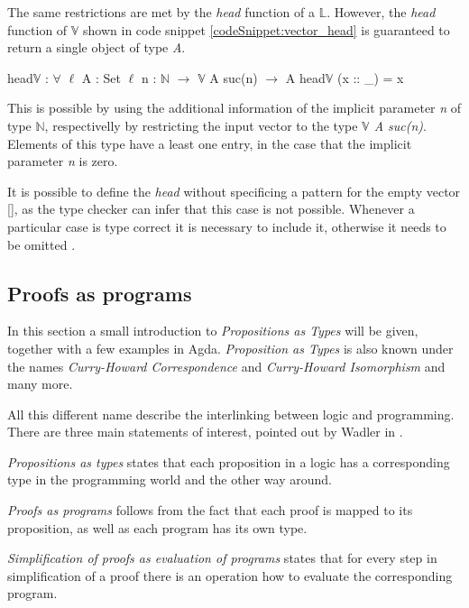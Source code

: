 The same restrictions are met by the \emph{head} function of a $\mathbb{L}$. 
However, the \emph{head} function of $\mathbb{V}$ shown in code snippet \ref{codeSnippet:vector_head} is guaranteed to return a single object of type \emph{A}.

\begin{codesnippet}[mathescape=true, caption={Definition of $head\mathbb{V}$ function in Agda}, label={codeSnippet:vector_head}]
head$\mathbb{V}$ : $\forall$ {$\ell$} {A : Set $\ell$} {n : $\mathbb{N}$} $\rightarrow$ 
        $\mathbb{V}$ A suc(n) $\rightarrow$ A
head$\mathbb{V}$ (x :: _) = x
\end{codesnippet}

This is possible by using the additional information of the implicit parameter \emph{n} of type $\mathbb{N}$, respectivelly by restricting the input vector to the type \emph{$\mathbb{V}$ A suc(n)}.
Elements of this type have a least one entry, in the case that the implicit parameter \emph{n} is zero.

It is possible to define the \emph{head} without specificing a pattern for the empty vector [], as the type checker can infer that this case is not possible.
Whenever a particular case is type correct it is necessary to include it, otherwise it needs to be omitted \cite{norell:deptyped}.

\subsection{Proofs as programs}\label{section:agda_proofs}
In this section a small introduction to \emph{Propositions as Types}\cite{10.1145/2699407} will be given, together with a few examples in Agda. 
\emph{Proposition as Types} is also known under the names \emph{Curry-Howard Correspondence}\cite{10.5555/1076265} and \emph{Curry-Howard Isomorphism}\cite{10.1145/2841316} and many more.

All this different name describe the interlinking between logic and programming.
There are three main statements of interest, pointed out by Wadler in \cite{10.1145/2699407}.

\emph{Propositions as types} states that each proposition in a logic has a corresponding type in the programming world and the other way around. 

\emph{Proofs as programs} follows from the fact that each proof is mapped to its proposition, as well as each program has its own type.

\emph{Simplification of proofs as evaluation of programs} states that for every step in simplification of a proof there is an operation how to evaluate the corresponding program.

